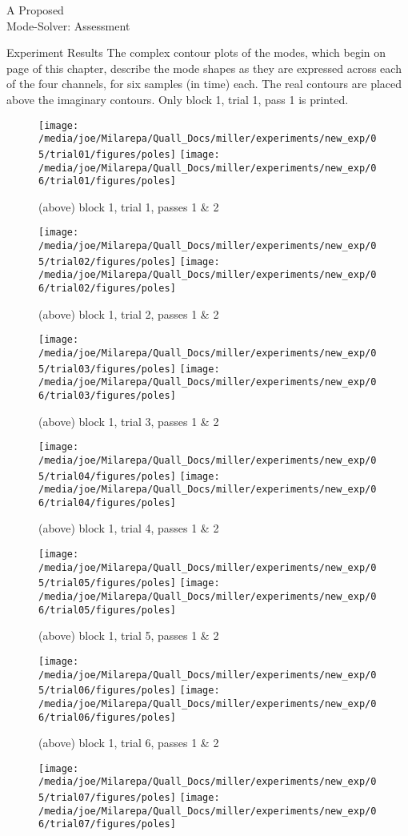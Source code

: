 \documentclass[a4paper,10pt]{report}
\numberwithin{equation}{section}
\begin{document}
\begin{chapter}{A Proposed \\Mode-Solver: Assessment}
\begin{section}{Experiment Results}
The complex contour plots of the modes, which begin on page \pageref{fig:mode_contours} of this chapter, describe the mode shapes as they are expressed across each of the four channels, for six samples (in time) each. The real contours are placed above the imaginary contours. Only block 1, trial 1, pass 1 is printed.
\begin{singlespace}
\begin{figure}[h]
\texttt{[image: /media/joe/Milarepa/Quall\_Docs/miller/experiments/new\_exp/05/trial01/figures/poles]}
\texttt{[image: /media/joe/Milarepa/Quall\_Docs/miller/experiments/new\_exp/06/trial01/figures/poles]}
\caption{(above) block 1, trial 1, passes 1 \& 2}
\texttt{[image: /media/joe/Milarepa/Quall\_Docs/miller/experiments/new\_exp/05/trial02/figures/poles]}
\texttt{[image: /media/joe/Milarepa/Quall\_Docs/miller/experiments/new\_exp/06/trial02/figures/poles]}
\caption{(above) block 1, trial 2, passes 1 \& 2}
\end{figure}
\begin{figure}[h]
\texttt{[image: /media/joe/Milarepa/Quall\_Docs/miller/experiments/new\_exp/05/trial03/figures/poles]}
\texttt{[image: /media/joe/Milarepa/Quall\_Docs/miller/experiments/new\_exp/06/trial03/figures/poles]}
\caption{(above) block 1, trial 3, passes 1 \& 2}
\texttt{[image: /media/joe/Milarepa/Quall\_Docs/miller/experiments/new\_exp/05/trial04/figures/poles]}
\texttt{[image: /media/joe/Milarepa/Quall\_Docs/miller/experiments/new\_exp/06/trial04/figures/poles]}
\caption{(above) block 1, trial 4, passes 1 \& 2}
\end{figure}
\begin{figure}[h]
\texttt{[image: /media/joe/Milarepa/Quall\_Docs/miller/experiments/new\_exp/05/trial05/figures/poles]}
\texttt{[image: /media/joe/Milarepa/Quall\_Docs/miller/experiments/new\_exp/06/trial05/figures/poles]}
\caption{(above) block 1, trial 5, passes 1 \& 2}
\texttt{[image: /media/joe/Milarepa/Quall\_Docs/miller/experiments/new\_exp/05/trial06/figures/poles]}
\texttt{[image: /media/joe/Milarepa/Quall\_Docs/miller/experiments/new\_exp/06/trial06/figures/poles]}
\caption{(above) block 1, trial 6, passes 1 \& 2}
\end{figure}
\begin{figure}[h]
\texttt{[image: /media/joe/Milarepa/Quall\_Docs/miller/experiments/new\_exp/05/trial07/figures/poles]}
\texttt{[image: /media/joe/Milarepa/Quall\_Docs/miller/experiments/new\_exp/06/trial07/figures/poles]}

\end{figure}
\end{singlespace}
\end{section}
\end{chapter}
\end{document}
